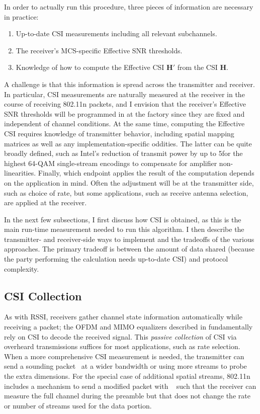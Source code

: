 In order to actually run this procedure, three pieces of information are necessary in practice:
\begin{enumerate}[parsep=1ex,itemsep=1ex,topsep=1ex]
	\item Up-to-date CSI measurements including all relevant subchannels.
	\item The receiver's MCS-specific Effective SNR thresholds.
	\item Knowledge of how to compute the Effective CSI $\mathbf{H}'$ from the CSI $\mathbf{H}$.
\end{enumerate}
A challenge is that this information is spread across the transmitter and receiver. In particular, CSI measurements are naturally measured at the receiver in the course of receiving 802.11n packets, and I envision that the receiver's Effective SNR thresholds will be programmed in at the factory since they are fixed and independent of channel conditions. At the same time, computing the Effective CSI requires knowledge of transmitter behavior, including spatial mapping matrices as well as any implementation-specific oddities. The latter can be quite broadly defined, such as Intel's reduction of transmit power by up to 5\dB for the highest 64-QAM single-stream encodings to compensate for amplifier non-linearities. Finally, which endpoint applies the result of the computation depends on the application in mind. Often the adjustment will be at the transmitter side, such as choice of rate, but some applications, such as receive antenna selection, are applied at the receiver.

In the next few subsections, I first discuss how CSI is obtained, as this is the main run-time measurement needed to run this algorithm. I then describe the transmitter- and receiver-side ways to implement  and the tradeoffs of the various approaches. The primary tradeoff is between the amount of data shared (because the party performing the calculation needs up-to-date CSI) and protocol complexity.

\subsection{CSI Collection}
\label{sec:csi_collection}
As with RSSI, receivers gather channel state information automatically while receiving a packet; the OFDM and MIMO equalizers described in  fundamentally rely on CSI to decode the received signal. This \emph{passive collection} of CSI via overheard transmissions suffices for most applications, such as rate selection. When a more comprehensive CSI measurement is needed, the transmitter can send a sounding packet~\cite[\S20.3.13.1]{80211n} at a wider bandwidth or using more streams to probe the extra dimensions. For the special case of additional spatial streams, 802.11n includes a mechanism to send a modified packet with ~\cite[\S20.3.9.4.6]{80211n} such that the receiver can measure the full channel during the preamble but that does not change the rate or number of streams used for the data portion.

